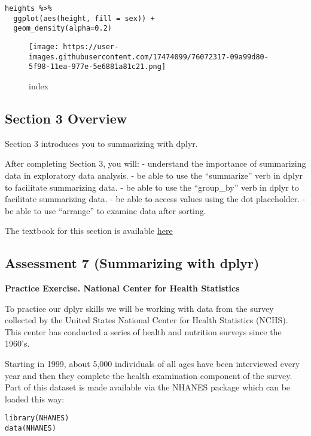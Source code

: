 \documentclass[]{article}
\begin{document}
\begin{verbatim}
heights %>% 
  ggplot(aes(height, fill = sex)) + 
  geom_density(alpha=0.2) 
\end{verbatim}

\begin{figure}
\centering
\texttt{[image: https://user-images.githubusercontent.com/17474099/76072317-09a99d80-5f98-11ea-977e-5e6881a81c21.png]}
\caption{index}
\end{figure}

\hypertarget{section-3-overview}{%
\subsection{Section 3 Overview}\label{section-3-overview}}

Section 3 introduces you to summarizing with dplyr.

After completing Section 3, you will: - understand the importance of
summarizing data in exploratory data analysis. - be able to use the
``summarize'' verb in dplyr to facilitate summarizing data. - be able to
use the ``group\_by'' verb in dplyr to facilitate summarizing data. - be
able to access values using the dot placeholder. - be able to use
``arrange'' to examine data after sorting.

The textbook for this section is available
\href{https://rafalab.github.io/dsbook/tidyverse.html\#tidy-data}{here}

\hypertarget{assessment-7-summarizing-with-dplyr}{%
\subsection{Assessment 7 (Summarizing with
dplyr)}\label{assessment-7-summarizing-with-dplyr}}

\textbf{Practice Exercise. National Center for Health Statistics}

To practice our dplyr skills we will be working with data from the
survey collected by the United States National Center for Health
Statistics (NCHS). This center has conducted a series of health and
nutrition surveys since the 1960's.

Starting in 1999, about 5,000 individuals of all ages have been
interviewed every year and then they complete the health examination
component of the survey. Part of this dataset is made available via the
NHANES package which can be loaded this way:

\begin{verbatim}
library(NHANES)
data(NHANES)
\end{verbatim}
\end{document}
